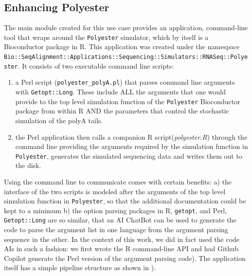 \documentclass[10pt]{article}
\begin{document}
\subsection{Enhancing Polyester}
The main module created for this use case provides an application, command-line tool that wraps around the \texttt{Polyester} simulator, which by itself is a Bioconductor package in R\cite{frazee_polyester_2015}. This application was created under the namespace \texttt{Bio::SeqAlignment::Applications::Sequencing::Simulators::RNASeq::Polyester}.
It consists of two executable command line scripts: 
\begin{enumerate}
\item a Perl script (\texttt{polyester\_polyA.pl}) that parses  command line arguments with \texttt{Getopt::Long}. These include ALL the arguments that one would provide to the top level simulation function of the \texttt{Polyester} Bioconductor package from within R AND the parameters that control the stochastic simulation of the polyA tails.
\item the Perl application then calls a companion R script(\textit{polyester.R}) through the command line providing the arguments required by the simulation function in \texttt{Polyester},  generates the simulated sequencing data and writes them out to the disk. 
\end{enumerate}
Using the command line to communicate comes with certain benefits: a) the interface of the two scripts is modeled after the arguments of the top level simulation function in \texttt{Polyester}, so that the additional documentation could be kept to a minimum b) the option parsing packages in R, \texttt{getopt},  and Perl,  \texttt{Getopt::Long} are so similar, that an AI ChatBot can be used to generate the code to parse the argument list in one language from the argument parsing sequence in the other. In the context of this work, we did in fact used the code AIs in such a fashion:  we first wrote the R command-line API and had Github Copilot generate the Perl version of the argument parsing code).  The application itself has a simple pipeline structure as shown in ).
\end{document}
